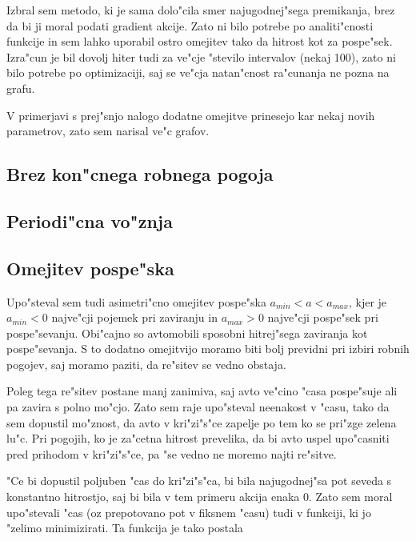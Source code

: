 \documentclass[a4paper,10pt]{article}
\begin{document}
Izbral sem metodo, ki je sama dolo"cila smer najugodnej"sega premikanja, brez da bi ji moral podati gradient akcije. Zato ni bilo potrebe po analiti"cnosti funkcije in sem lahko uporabil ostro omejitev tako da hitrost kot za pospe"sek. Izra"cun je bil dovolj hiter tudi za ve"cje "stevilo intervalov (nekaj 100), zato ni bilo potrebe po optimizaciji, saj se ve"cja natan"cnost ra"cunanja ne pozna na grafu. 

V primerjavi s prej"snjo nalogo dodatne omejitve prinesejo kar nekaj novih parametrov, zato sem narisal ve"c grafov. 

\subsection{Brez kon"cnega robnega pogoja}




\subsection{Periodi"cna vo"znja}






\subsection{Omejitev pospe"ska}
Upo"steval sem tudi asimetri"cno omejitev pospe"ska $a_{min} < a < a_{max}$, kjer je $a_{min}<0$ najve"cji pojemek pri zaviranju in $a_{max} > 0$ najve"cji pospe"sek pri pospe"sevanju. Obi"cajno so avtomobili sposobni hitrej"sega zaviranja kot pospe"sevanja. S to dodatno omejitvijo moramo biti bolj previdni pri izbiri robnih pogojev, saj moramo paziti, da re"sitev se vedno obstaja. 

Poleg tega re"sitev postane manj zanimiva, saj avto ve"cino "casa pospe"suje ali pa zavira s polno mo"cjo. Zato sem raje upo"steval neenakost v "casu, tako da sem dopustil mo"znost, da avto v kri"zi"s"ce zapelje po tem ko se pri"zge zelena lu"c. Pri pogojih, ko je za"cetna hitrost prevelika, da bi avto uspel upo"casniti pred prihodom v kri"zi"s"ce, pa "se vedno ne moremo najti re"sitve. 

"Ce bi dopustil poljuben "cas do kri"zi"s"ca, bi bila najugodnej"sa pot seveda s konstantno hitrostjo, saj bi bila v tem primeru akcija enaka 0. Zato sem moral upo"stevali "cas (oz prepotovano pot v fiksnem "casu) tudi v funkciji, ki jo "zelimo minimizirati. Ta funkcija je tako postala
\end{document}
